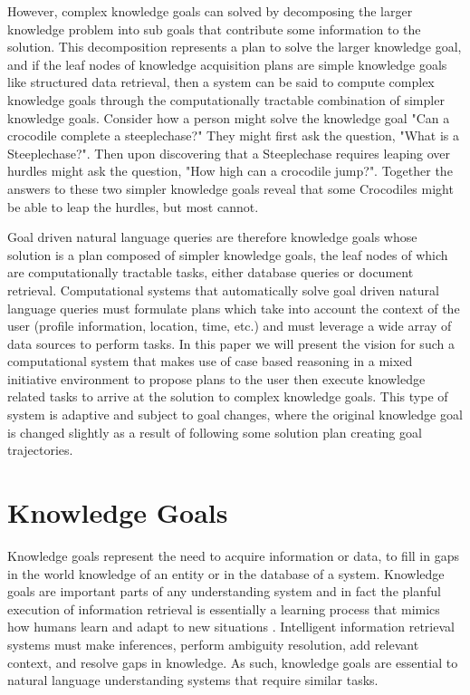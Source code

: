 \documentclass[11pt,letterpaper]{article}
\begin{document}
However, complex knowledge goals can solved by decomposing the larger knowledge problem into sub goals that contribute some information to the solution. This decomposition represents a plan to solve the larger knowledge goal, and if the leaf nodes of knowledge acquisition plans are simple knowledge goals like structured data retrieval, then a system can be said to compute complex knowledge goals through the computationally tractable combination of simpler knowledge goals. Consider how a person might solve the knowledge goal "Can a crocodile complete a steeplechase?" They might first ask the question, "What is a Steeplechase?". Then upon discovering that a Steeplechase requires leaping over hurdles might ask the question, "How high can a crocodile jump?". Together the answers to these two simpler knowledge goals reveal that some Crocodiles might be able to leap the hurdles, but most cannot.

Goal driven natural language queries are therefore knowledge goals whose solution is a plan composed of simpler knowledge goals, the leaf nodes of which are computationally tractable tasks, either database queries or document retrieval. Computational systems that automatically solve goal driven natural language queries must formulate plans which take into account the context of the user (profile information, location, time, etc.) and must leverage a wide array of data sources to perform tasks. In this paper we will present the vision for such a computational system that makes use of case based reasoning in a mixed initiative environment to propose plans to the user then execute knowledge related tasks to arrive at the solution to complex knowledge goals. This type of system is adaptive and subject to goal changes, where the original knowledge goal is changed slightly as a result of following some solution plan creating goal trajectories.

\section{Knowledge Goals}

Knowledge goals represent the need to acquire information or data, to fill in gaps in the world knowledge of an entity or in the database of a system. Knowledge goals are important parts of any understanding system and in fact the planful execution of information retrieval is essentially a learning process that mimics how humans learn and adapt to new situations \cite{ram_goal-based_1991}. Intelligent information retrieval systems must make inferences, perform ambiguity resolution, add relevant context, and resolve gaps in knowledge. As such, knowledge goals are essential to natural language understanding systems that require similar tasks.
\end{document}
